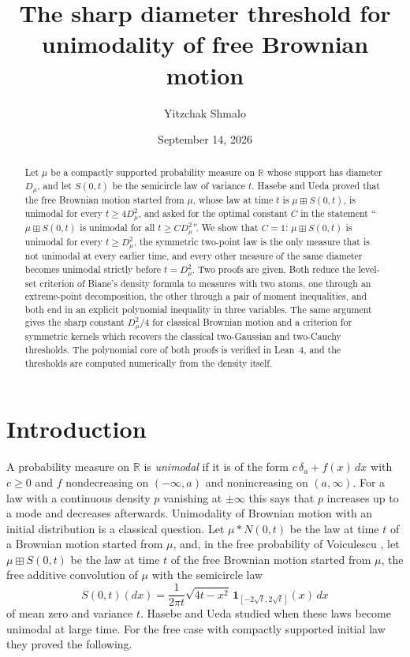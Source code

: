 \documentclass[11pt]{amsart}
\title[Sharp unimodality threshold for free Brownian motion]{The sharp diameter threshold for unimodality of free Brownian motion}
\author{Yitzchak Shmalo}
\date{September 14, 2026}
\theoremstyle{definition}
\newcommand{\R}{\mathbb{R}}
\newcommand{\bp}{\boxplus}
\begin{document}
\begin{abstract}
Let $\mu$ be a compactly supported probability measure on $\R$ whose support has diameter $D_\mu$, and let $S(0,t)$ be the semicircle law of variance $t$. Hasebe and Ueda proved that the free Brownian motion started from $\mu$, whose law at time $t$ is $\mu\bp S(0,t)$, is unimodal for every $t\ge 4D_\mu^2$, and asked for the optimal constant $C$ in the statement ``$\mu\bp S(0,t)$ is unimodal for all $t\ge C D_\mu^2$''. We show that $C=1$: $\mu\bp S(0,t)$ is unimodal for every $t\ge D_\mu^2$, the symmetric two-point law is the only measure that is not unimodal at every earlier time, and every other measure of the same diameter becomes unimodal strictly before $t=D_\mu^2$. Two proofs are given. Both reduce the level-set criterion of Biane's density formula to measures with two atoms, one through an extreme-point decomposition, the other through a pair of moment inequalities, and both end in an explicit polynomial inequality in three variables. The same argument gives the sharp constant $D_\mu^2/4$ for classical Brownian motion and a criterion for symmetric kernels which recovers the classical two-Gaussian and two-Cauchy thresholds. The polynomial core of both proofs is verified in Lean~4, and the thresholds are computed numerically from the density itself.
\end{abstract}

\maketitle

\section{Introduction}

A probability measure on $\R$ is \emph{unimodal} if it is of the form $c\,\delta_a+f(x)\,dx$ with $c\ge 0$ and $f$ nondecreasing on $(-\infty,a)$ and nonincreasing on $(a,\infty)$. For a law with a continuous density $p$ vanishing at $\pm\infty$ this says that $p$ increases up to a mode and decreases afterwards. Unimodality of Brownian motion with an initial distribution is a classical question. Let $\mu*N(0,t)$ be the law at time $t$ of a Brownian motion started from $\mu$, and, in the free probability of Voiculescu \cite{Voiculescu86, NicaSpeicher}, let $\mu\bp S(0,t)$ be the law at time $t$ of the free Brownian motion started from $\mu$, the free additive convolution of $\mu$ with the semicircle law
\[
S(0,t)(dx)=\frac{1}{2\pi t}\sqrt{4t-x^2}\,\mathbf 1_{[-2\sqrt t,2\sqrt t]}(x)\,dx
\]
of mean zero and variance $t$. Hasebe and Ueda \cite{HasebeUeda} studied when these laws become unimodal at large time. For the free case with compactly supported initial law they proved the following.
\end{document}

